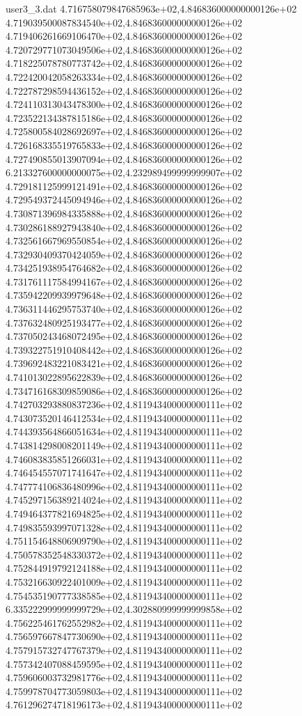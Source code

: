 \begin{filecontents}{user3_3.dat}
4.716758079847685963e+02,4.846836000000000126e+02
4.719039500087834540e+02,4.846836000000000126e+02
4.719406261669106470e+02,4.846836000000000126e+02
4.720729771073049506e+02,4.846836000000000126e+02
4.718225078780773742e+02,4.846836000000000126e+02
4.722420042058263334e+02,4.846836000000000126e+02
4.722787298594436152e+02,4.846836000000000126e+02
4.724110313043478300e+02,4.846836000000000126e+02
4.723522134387815186e+02,4.846836000000000126e+02
4.725800584028692697e+02,4.846836000000000126e+02
4.726168335519765833e+02,4.846836000000000126e+02
4.727490855013907094e+02,4.846836000000000126e+02
6.213327600000000075e+02,4.232989499999999907e+02
4.729181125999121491e+02,4.846836000000000126e+02
4.729549372445094946e+02,4.846836000000000126e+02
4.730871396984335888e+02,4.846836000000000126e+02
4.730286188927943840e+02,4.846836000000000126e+02
4.732561667969550854e+02,4.846836000000000126e+02
4.732930409370424059e+02,4.846836000000000126e+02
4.734251938954764682e+02,4.846836000000000126e+02
4.731761117584994167e+02,4.846836000000000126e+02
4.735942209939979648e+02,4.846836000000000126e+02
4.736311446295753740e+02,4.846836000000000126e+02
4.737632480925193477e+02,4.846836000000000126e+02
4.737050243468072495e+02,4.846836000000000126e+02
4.739322751910408442e+02,4.846836000000000126e+02
4.739692483221083421e+02,4.846836000000000126e+02
4.741013022895622839e+02,4.846836000000000126e+02
4.734716168309859086e+02,4.846836000000000126e+02
4.742703293880837236e+02,4.811943400000000111e+02
4.743073520146412534e+02,4.811943400000000111e+02
4.744393564866051634e+02,4.811943400000000111e+02
4.743814298008201149e+02,4.811943400000000111e+02
4.746083835851266031e+02,4.811943400000000111e+02
4.746454557071741647e+02,4.811943400000000111e+02
4.747774106836480996e+02,4.811943400000000111e+02
4.745297156389214024e+02,4.811943400000000111e+02
4.749464377821694825e+02,4.811943400000000111e+02
4.749835593997071328e+02,4.811943400000000111e+02
4.751154648806909790e+02,4.811943400000000111e+02
4.750578352548330372e+02,4.811943400000000111e+02
4.752844919792124188e+02,4.811943400000000111e+02
4.753216630922401009e+02,4.811943400000000111e+02
4.754535190777338585e+02,4.811943400000000111e+02
6.335222999999999729e+02,4.302880999999999858e+02
4.756225461762552982e+02,4.811943400000000111e+02
4.756597667847730690e+02,4.811943400000000111e+02
4.757915732747767379e+02,4.811943400000000111e+02
4.757342407088459595e+02,4.811943400000000111e+02
4.759606003732981776e+02,4.811943400000000111e+02
4.759978704773059803e+02,4.811943400000000111e+02
4.761296274718196173e+02,4.811943400000000111e+02

\end{filecontents}
